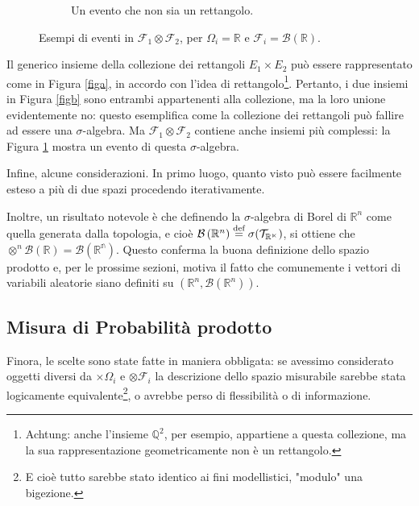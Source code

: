 \begin{figure}[H]
\begin{subfigure}{.3\textwidth}
		\caption{Un evento che non sia un rettangolo.}			\label{figc}	
	\end{subfigure}
	\caption{Esempi di eventi in $\mathcal{F}_1 \otimes \mathcal{F}_2$, per $\Omega_i=\mathbb{R}$ e $\mathcal{F}_i = \mathcal{B}(\mathbb{R})$.}	\label{fig}
\end{figure}	
Il generico insieme della collezione dei rettangoli $E_1 \times E_2$ può essere rappresentato come in Figura \ref{figa}, in accordo con l'idea di rettangolo\footnote{Achtung: anche l'insieme $\mathbb{Q}^2$, per esempio, appartiene a questa collezione, ma la sua rappresentazione geometricamente non è un rettangolo.}. 
Pertanto, i due insiemi in Figura \ref{figb} sono entrambi appartenenti alla collezione, ma la loro unione evidentemente no: questo esemplifica come la collezione dei rettangoli può fallire ad essere una $\sigma$-algebra. 
Ma $\mathcal{F}_1 \otimes \mathcal{F}_2$ contiene anche insiemi più complessi: la Figura \ref{figc} mostra un evento di questa $\sigma$-algebra.
\par Infine, alcune considerazioni. In primo luogo, quanto visto può essere facilmente esteso a più di due spazi procedendo iterativamente.
\par Inoltre, un risultato notevole è che definendo la $\sigma$-algebra di Borel di $\mathbb{R}^n$ come quella generata dalla topologia, e cioè $\mathcal{B}\left(\mathbb{R}^n\right) \stackrel{\text{def}}{=} \sigma(\mathcal{T}_\mathbb{R^n})$, si ottiene che $\otimes^n \mathcal{B}(\mathbb{R}) = \mathcal{B}\left(\mathbb{R^n}\right)$. Questo conferma la buona definizione dello spazio prodotto e, per le prossime sezioni, motiva il fatto che comunemente i vettori di variabili aleatorie siano definiti su $\left(\mathbb{R}^n,\mathcal{B}(\mathbb{R}^n)\right)$.

\subsection{Misura di Probabilità prodotto}
Finora, le scelte sono state fatte in maniera obbligata: se avessimo considerato oggetti diversi da $\times \Omega_i$ e $\otimes \mathcal{F}_i$ la descrizione dello spazio misurabile sarebbe stata logicamente equivalente\footnote{E cioè tutto sarebbe stato identico ai fini modellistici, "modulo" una bigezione.}, o avrebbe perso di flessibilità o di informazione.

